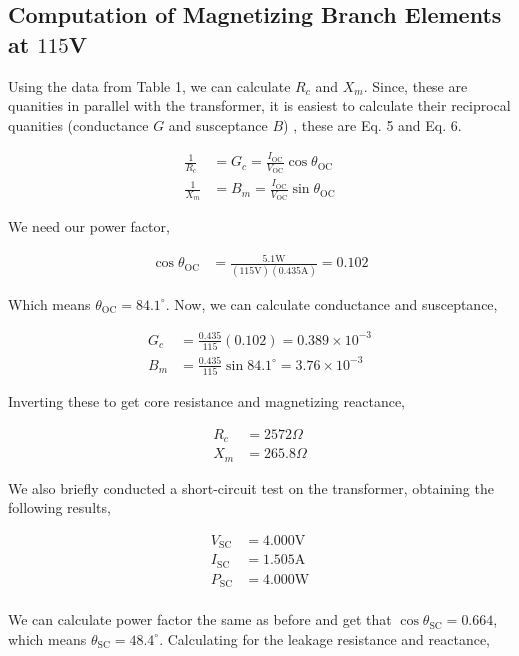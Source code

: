 \documentclass{IEEEtran}
\begin{document}
\subsection{Computation of Magnetizing Branch Elements at \(115\)V}

Using the data from Table 1, we can calculate \(R_c\) and \(X_m\). Since, these are quanities in parallel with the transformer, it is easiest to calculate their reciprocal quanities (conductance \(G\) and susceptance \(B\)) \cite{labmanual}, these are Eq. 5 and Eq. 6.

\begin{align}
    \frac{1}{R_c} &= G_c = \frac{I_{\text{OC}}}{V_{\text{OC}}} \cos {\theta_{\text{OC}}} \\
    \frac{1}{X_m} &= B_m = \frac{I_{\text{OC}}}{V_{\text{OC}}} \sin {\theta_{\text{OC}}}
\end{align}

We need our power factor,

\begin{align*}
    \cos{\theta_{\text{OC}}} &= \frac{5.1 \text{W}}{( 115 \text{V} )( 0.435 \text{A} )} = 0.102
\end{align*}

Which means \( \theta_{\text{OC}} = 84.1^\circ \). Now, we can calculate conductance and susceptance,

\begin{align*}
    G_c &= \frac{0.435}{115} (0.102) = 0.389 \times 10^{-3} \\
    B_m &= \frac{0.435}{115} \sin{84.1^\circ} = 3.76 \times 10^{-3}
\end{align*}

Inverting these to get core resistance and magnetizing reactance,

\begin{align*}
    R_c &= 2572 \Omega \\
    X_m &= 265.8 \Omega
\end{align*}

We also briefly conducted a short-circuit test on the transformer, obtaining the following results,

\begin{align*}
    V_{\text{SC}} &= 4.000 \text{V} \\
    I_{\text{SC}} &= 1.505 \text{A} \\
    P_{\text{SC}} &= 4.000 \text{W} \\
\end{align*}

We can calculate power factor the same as before and get that \( \cos{\theta_{\text{SC}}} = 0.664\), which means \( \theta_{\text{SC}} = 48.4^\circ \). Calculating for the leakage resistance and reactance,
\end{document}

